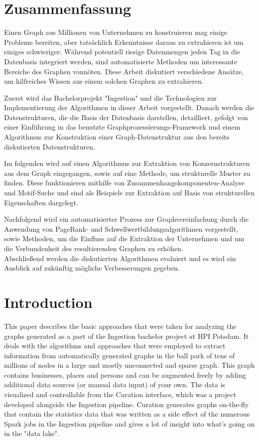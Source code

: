 \documentclass[
        a4paper,     %
        titlepage,   %
        oneside,     %
        parskip      %
]{scrartcl}          %
\begin{document}
  \section*{Zusammenfassung}
  { \large
    Einen Graph aus Millionen von Unternehmen zu konstruieren mag einige Probleme
    bereiten, aber tats\"achlich Erkenntnisse daraus zu extrahieren ist um einiges schwieriger.
    W\"ahrend potentiell riesige Datenmengen jeden Tag in die Datenbasis integriert werden,
    sind automatisierte Methoden um interessante Bereiche des Graphen vonn\"oten.
    Diese Arbeit diskutiert verschiedene Ans\"atze, um hilfreiches Wissen aus einem solchen Graphen zu extrahieren.

    Zuerst wird das Bachelorprojekt "Ingestion" und die Technologien zur Implementierung
    der Algorithmen in dieser Arbeit vorgestellt. Danach werden die Datenstrukturen, die die Basis der
    Datenbasis darstellen, detailliert, gefolgt von einer Einf\"uhrung in das benutzte
    Graphprozessierungs-Framework und einem Algorithmus zur Konstruktion einer Graph-Datenstruktur
    aus den bereits diskutierten Datenstrukturen.

    Im folgenden wird auf einen Algorithmus zur Extraktion von Konzernstrukturen aus dem Graph eingegangen,
    sowie auf eine Methode, um strukturelle Muster zu finden. Diese funktionieren
    mithilfe von Zusammenhangskomponenten-Analyse und Motif-Suche und sind als
    Beispiele zur Extraktion auf Basis von strukturellen Eigenschaften dargelegt.

    Nachfolgend wird ein automatisierter Prozess zur Graphvereinfachung durch die
    Anwendung von PageRank- und Schwellwertbildungsalgorithmen vorgestellt, sowie
    Methoden, um die Einfluss auf die Extraktion der Unternehmen und um die Verbundenheit
    des resultierenden Graphen zu erh\"ohen.\\
    Abschlie{\ss}end werden die diskutierten Algorithmen evaluiert
    und es wird ein Ausblick auf zuk\"unftig m\"ogliche Verbesserungen gegeben.
  }
  \clearpage

  \tableofcontents
  \pagebreak

  \section{Introduction}
    This paper describes the basic approaches that were taken for analyzing the
    graphs generated as a part of the Ingestion bachelor project at HPI Potsdam.
    It deals with the algorithms and approaches that were employed to extract
    information from automatically generated graphs in the ball park of
    tens of millions of nodes in a large and mostly unconnected and sparse graph.
    This graph contains businesses, places and persons and can be augmented freely by adding
    additional data sources (or manual data input) of your own. The data is visualized and controllable from the
    Curation interface, which was a project developed alongside the Ingestion pipeline.
    Curation generates graphs on-the-fly that contain the statistics data that was written
    as a side effect of the numerous Spark jobs in the Ingestion pipeline and gives
    a lot of insight into what's going on in the "data lake".
\end{document}
